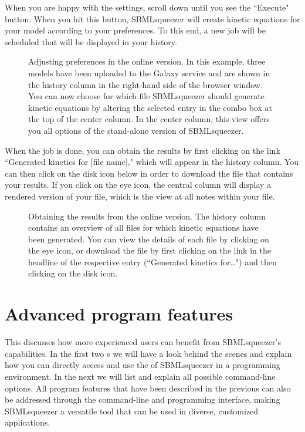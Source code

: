 When you are happy with the settings, scroll down until you see the ``Execute" button.
When you hit this button, SBMLsqueezer will create kinetic equations for your model according to your preferences.
To this end, a new job will be scheduled that will be displayed in your history.
\begin{figure}
\caption[Adjusting preferences in the online version]{Adjusting preferences in the online version.
In this example, three models have been uploaded to the Galaxy service and are shown in the history column in the right-hand side of the browser window.
You can now choose for which file SBMLsqueezer should generate kinetic equations by altering the selected entry in the combo box at the top of the center column.
In the center column, this view offers you all options of the stand-alone version of SBMLsqueezer.}
\label{fig:WebserviceConfiguration}
\end{figure}

When the job is done, you can obtain the results by first clicking on the link ``Generated kinetics for [file name]," which will appear in the history column.
You can then click on the disk icon below in order to download the \SBML file that contains your results.
If you click on the eye icon, the central column will display a rendered version of your \SBML file, which is the view at all \XHTML notes within your file.
\begin{figure}
\caption[Obtaining the results from the online version]{Obtaining the results from the online version.
The history column contains an overview of all files for which kinetic equations have been generated.
You can view the details of each file by clicking on the eye icon, or download the file by first clicking on the link in the headline of the respective entry (``Generated kinetics for\ldots") and then clicking on the disk icon.}
\label{fig:WebserviceResult}
\end{figure}

\chapter{Advanced program features}
\label{chap:AdvancedFeatures}

This  discusses how more experienced users can benefit from SBMLsqueezer's capabilities.
In the first two s we will have a look behind the scenes and explain how you can directly access and use the \API of SBMLsqueezer in a programming environment.
In the next  we will list and explain all possible command-line options.
All program features that have been described in the previous  can also be addressed through the command-line and programming interface, making SBMLsqueezer a versatile tool that can be used in diverse, customized applications.

